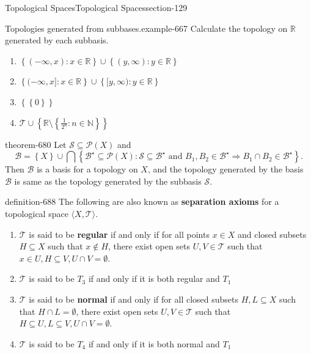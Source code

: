 \documentclass[oneside,10pt,]{article}
\newcommand{\terminology}[1]{\textbf{#1}}
\newcommand{\tuple}[1]{\langle #1 \rangle}
\newcommand{\mb}{\mathbb}
\newcommand{\mc}{\mathcal}
\newcommand{\setBuilder}[2]{\left\{#1:#2\right\}}
\newcommand{\setList}[1]{\left\{#1\right\}}
\begin{document}
\begin{sectionptx}{Topological Spaces}{}{Topological Spaces}{}{}{section-129}
\begin{example}{Topologies generated from subbases.}{example-667}
\hypertarget{p-669}{}%
Calculate the topology on \(\mb R\) generated by each subbasis.%
\leavevmode%
\begin{enumerate}
\item\hypertarget{li-672}{}\(\setBuilder{(-\infty,x)}{x\in\mb R}\cup\setBuilder{(y,\infty)}{y\in\mb R}\)%
\item\hypertarget{li-674}{}\(\setBuilder{(-\infty,x]}{x\in\mb R}\cup\setBuilder{[y,\infty)}{y\in\mb R}\)%
\item\hypertarget{li-676}{}\(\setList{\setList{0}}\)%
\item\hypertarget{li-678}{}\(\mc T\cup\setList{\mb R\setminus\setBuilder{\frac{1}{2^n}}{n\in\mb N}}\)%
\end{enumerate}
\end{example}
\begin{theorem}{}{}{theorem-680}%
\hypertarget{p-681}{}%
Let \(\mc S\subseteq\mc P(X)\) and%
\begin{equation*}
\mc B=\setList{X}\cup\bigcap\setBuilder{\mc B^\star\subseteq\mc P(X)}
{\mc S\subseteq\mc B^\star\text{ and }
B_1,B_2\in\mc B^\star\Rightarrow B_1\cap B_2\in\mc B^\star}.
\end{equation*}
Then \(\mc B\) is a basis for a topology on \(X\), and the topology generated by the basis \(\mc B\) is same as the topology generated by the subbasis \(\mc S\).%
\end{theorem}
\begin{definition}{}{definition-688}%
\hypertarget{p-689}{}%
The following are also known as \terminology{separation axioms} for a topological space \(\tuple{X,\mc T}\).%
\leavevmode%
\begin{enumerate}
\item\hypertarget{li-693}{}\(\mc T\) is said to be \terminology{regular} if and only if for all points \(x\in X\) and closed subsets \(H\subseteq X\) such that \(x\not\in H\), there exist open sets \(U,V\in\mc T\) such that \(x\in U,H\subseteq V,U\cap V=\emptyset\).%
\item\hypertarget{li-701}{}\(\mc T\) is said to be \terminology{\(T_3\)} if and only if it is both regular and \(T_1\)%
\item\hypertarget{li-706}{}\(\mc T\) is said to be \terminology{normal} if and only if for all closed subsets \(H,L\subseteq X\) such that \(H\cap L=\emptyset\), there exist open sets \(U,V\in\mc T\) such that \(H\subseteq U,L\subseteq V,U\cap V=\emptyset\).%
\item\hypertarget{li-713}{}\(\mc T\) is said to be \terminology{\(T_4\)} if and only if it is both normal and \(T_1\)%

\end{enumerate}
\end{definition}
\end{sectionptx}
\end{document}
